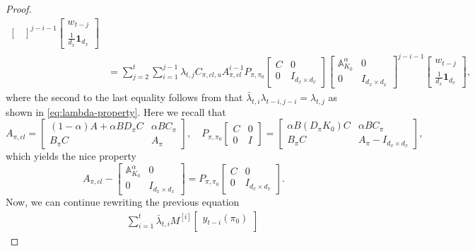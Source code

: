 \begin{proof}
\begin{align*}
\begin{bmatrix}
\end{bmatrix}^{j-i-1} \begin{bmatrix}
    w_{t-j} \\ \frac{1}{d_x}\mathbf{1}_{d_x}
\end{bmatrix}\\
&=\sum_{j=2}^t \sum_{i=1}^{j-1} \lambda_{t,j} C_{\pi,cl,u} A_{\pi,cl}^{i-1} P_{\pi,\pi_0} \begin{bmatrix}
    C & 0 \\ 0 & I_{d_x\times d_x}
\end{bmatrix} \begin{bmatrix}
    \mathbb{A}_{K_0}^{\alpha} & 0 \\ 0 & I_{d_x\times d_x}
\end{bmatrix}^{j-i-1} \begin{bmatrix}
    w_{t-j} \\ \frac{1}{d_x}\mathbf{1}_{d_x}
\end{bmatrix},
\end{align*}
where the second to the last equality follows from that $\bar{\lambda}_{t,i}\lambda_{t-i, j-i}=\lambda_{t,j}$ as shown in \cref{eq:lambda-property}. Here we recall that
$$
A_{\pi,cl}=\begin{bmatrix}
    (1-\alpha)A+\alpha BD_{\pi}C & \alpha B C_{\pi} \\ B_{\pi} C & A_{\pi}
\end{bmatrix}, \quad P_{\pi,\pi_0} \begin{bmatrix}
    C & 0 \\ 0 & I
\end{bmatrix}= \begin{bmatrix}
    \alpha B(D_{\pi} K_0)C & \alpha B C_{\pi} \\ B_{\pi} C & A_{\pi} - I_{d_x \times d_x}
\end{bmatrix},
$$
which yields the nice property
$$
A_{\pi,cl}-\begin{bmatrix}
    \mathbb{A}_{K_0}^{\alpha} & 0 \\ 0 & I_{d_x\times d_x}
\end{bmatrix}=P_{\pi,\pi_0} \begin{bmatrix}
    C & 0 \\ 0 & I_{d_x \times d_x}
\end{bmatrix}.
$$
Now, we can continue rewriting the previous equation
\begin{align*}
    & \quad \sum_{i=1}^t\bar{\lambda}_{t,i}M^{[i]}\begin{bmatrix}
    y_{t-i}(\pi_0) \\

\end{bmatrix}
\end{align*}
\end{proof}

